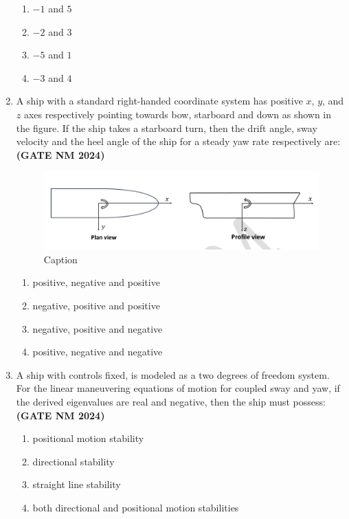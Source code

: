 \documentclass[journal,15pt,onecolumn]{IEEEtran}
\theoremstyle{remark}
\begin{document}
\begin{enumerate}
    \begin{enumerate}
        \item $-1$ and $5$
        \item $-2$ and $3$
        \item $-5$ and $1$
        \item $-3$ and $4$
    \end{enumerate}

 \item A ship with a standard right-handed coordinate system has positive $x$, $y$, and $z$ axes respectively pointing towards bow, starboard and down as shown in the figure. If the ship takes a starboard turn, then the drift angle, sway velocity and the heel angle of the ship for a steady yaw rate respectively are:\hfill \textbf{ (GATE NM 2024)}

\begin{figure}[h!]
    \centering
    \includegraphics[width=0.8\linewidth]{figures.tex/Screenshot 2025-08-20 152911.png}
    \caption{Caption}
    \label{fig:placeholder}
\end{figure}

\begin{enumerate}
        \item positive, negative and positive
        \item negative, positive and positive
        \item negative, positive and negative
        \item positive, negative and negative
    \end{enumerate}

  \item A ship with controls fixed, is modeled as a two degrees of freedom system. For the linear maneuvering equations of motion for coupled sway and yaw, if the derived eigenvalues are real and negative, then the ship must possess:\hfill \textbf{ (GATE NM 2024)}

    \begin{enumerate}
        \item positional motion stability
        \item directional stability
        \item straight line stability
        \item both directional and positional motion stabilities
    \end{enumerate}


\end{enumerate}
\end{document}
